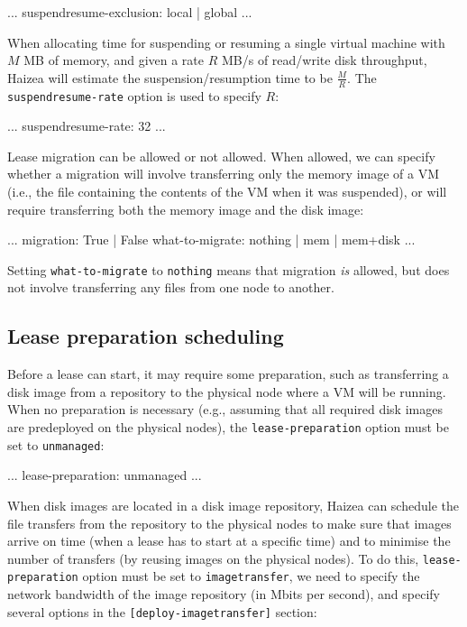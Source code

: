 \begin{wideshellverbatim}
[scheduling]
...
suspendresume-exclusion: local | global
...
\end{wideshellverbatim}

When allocating time for suspending or resuming a single virtual machine with $M$ MB of memory, and given a rate $R$ MB/s of read/write disk throughput, Haizea will estimate the suspension/resumption time to be $\frac{M}{R}$. The \texttt{suspendresume-rate} option is used to specify $R$:

\begin{wideshellverbatim}
[simulation]
...
suspendresume-rate: 32
...
\end{wideshellverbatim}

Lease migration can be allowed or not allowed. When allowed, we can specify whether a migration will involve transferring only the memory image of a VM (i.e., the file containing the contents of the VM when it was suspended), or will require transferring both the memory image and the disk image:

\begin{wideshellverbatim}
[scheduling]
...
migration: True | False
what-to-migrate: nothing | mem | mem+disk
...
\end{wideshellverbatim}

Setting \texttt{what-to-migrate} to \texttt{nothing} means that migration \emph{is} allowed, but does not involve transferring any files from one node to another.


\subsection{Lease preparation scheduling}

Before a lease can start, it may require some preparation, such as transferring a disk image from a repository to the physical node where a VM will be running. When no preparation is necessary (e.g., assuming that all required disk images are predeployed on the physical nodes), the \texttt{lease-preparation} option must be set to \texttt{unmanaged}:

\begin{wideshellverbatim}
[general]
...
lease-preparation: unmanaged
...
\end{wideshellverbatim}

When disk images are located in a disk image repository, Haizea can schedule the file transfers from the repository to the physical nodes to make sure that images arrive on time (when a lease has to start at a specific time) and to minimise the number of transfers (by reusing images on the physical nodes). To do this, \texttt{lease-preparation} option must be set to \texttt{imagetransfer}, we need to specify the network bandwidth of the image repository (in Mbits per second), and specify several options in the \texttt{[deploy-imagetransfer]} section:

